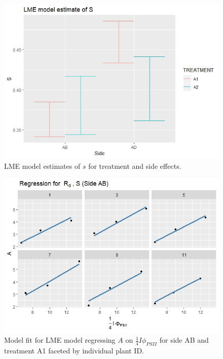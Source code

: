 \documentclass[11pt]{article} %
\begin{document}
\begin{figure}[h]
\centering
\includegraphics[scale=0.85]{Images/lme_estimate_s}
\caption{LME model estimates of $s$ for treatment and side effects.}
\label{fig:lme_s}
\end{figure}

\begin{figure}[h]
\centering
\includegraphics[scale=0.85]{Images/rd_s_ab}
\caption{Model fit for LME model regressing $A$ on $\frac{1}{4} I \phi_{PSII}$ for side AB and treatment A1 faceted by individual plant ID.}
\label{fig:lme_fit_ab}
\end{figure}
\end{document}

